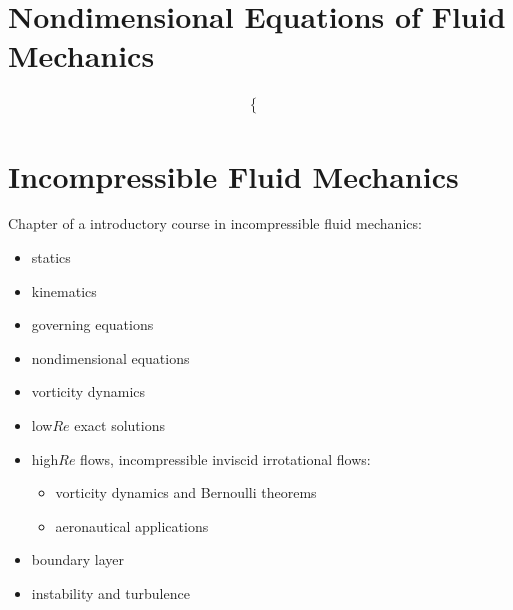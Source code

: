 \documentclass[letterpaper,10pt,english]{jupyterBook}
\begin{document}
\sphinxstepscope


\chapter{Non\sphinxhyphen{}dimensional Equations of Fluid Mechanics}
\label{\detokenize{ch/fluids/dimensional-analysis:non-dimensional-equations-of-fluid-mechanics}}\label{\detokenize{ch/fluids/dimensional-analysis:fluid-mechanics-dimensional-analysis}}\label{\detokenize{ch/fluids/dimensional-analysis::doc}}\begin{equation*}
\begin{split}\begin{cases}
  \frac{}{}
\end{cases}\end{split}
\end{equation*}
\sphinxstepscope


\chapter{Incompressible Fluid Mechanics}
\label{\detokenize{ch/fluids/incompressible:incompressible-fluid-mechanics}}\label{\detokenize{ch/fluids/incompressible:fluid-mechanics-incompressible}}\label{\detokenize{ch/fluids/incompressible::doc}}
\sphinxAtStartPar
Chapter of a introductory course in incompressible fluid mechanics:
\begin{itemize}
\item {} 
\sphinxAtStartPar
statics

\item {} 
\sphinxAtStartPar
kinematics

\item {} 
\sphinxAtStartPar
governing equations

\item {} 
\sphinxAtStartPar
non\sphinxhyphen{}dimensional equations

\item {} 
\sphinxAtStartPar
vorticity dynamics

\item {} 
\sphinxAtStartPar
low\sphinxhyphen{}\(Re\) exact solutions

\item {} 
\sphinxAtStartPar
high\sphinxhyphen{}\(Re\) flows, incompressible inviscid irrotational flows:
\begin{itemize}
\item {} 
\sphinxAtStartPar
vorticity dynamics and Bernoulli theorems

\item {} 
\sphinxAtStartPar
aeronautical applications

\end{itemize}

\item {} 
\sphinxAtStartPar
boundary layer

\item {} 
\sphinxAtStartPar
instability and turbulence

\end{itemize}
\end{document}
